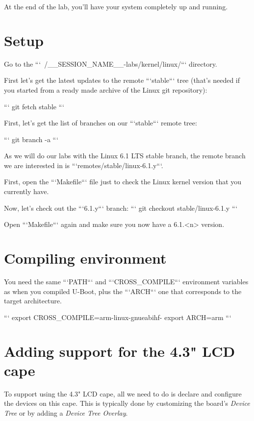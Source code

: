 
At the end of the lab, you'll have your system completely up and
running.

\section{Setup}

Go to the ```~/__SESSION_NAME__-labs/kernel/linux/``` directory.

First let's get the latest updates to the remote ```stable``` tree
(that's needed if you started from a ready made archive of the Linux git
repository):

```
git fetch stable
```

First, let's get the list of branches on our ```stable``` remote tree:

```
git branch -a
```

As we will do our labs with the Linux 6.1 LTS stable branch, the remote branch
we are interested in is ```remotes/stable/linux-6.1.y```.

First, open the ```Makefile``` file just to check the Linux kernel
version that you currently have.

Now, let's check out the ```6.1.y``` branch:
```
git checkout stable/linux-6.1.y
```

Open ```Makefile``` again and make sure you now have a 6.1.<n> version.

\section{Compiling environment}

You need the same ```PATH``` and ```CROSS_COMPILE``` environment
variables as when you compiled U-Boot, plus the ```ARCH``` one that
corresponds to the target architecture.

```
export CROSS_COMPILE=arm-linux-gnueabihf-
export ARCH=arm
```

\section{Adding support for the 4.3" LCD cape}

To support using the 4.3" LCD cape, all we need to do is declare and
configure the devices on this cape. This is typically done by
customizing the board's {\em Device Tree} or by adding a {\em Device
Tree Overlay}.

